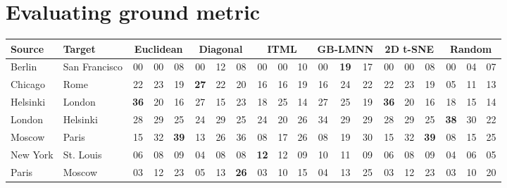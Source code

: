 \documentclass[svgnames,a4paper,final,notitlepage,10pt]{article}
\newcommand{\cbest}[1]{\textbf{#1}}
\newcommand{\notbest}[1]{\textcolor{light-gray}{#1}}
\begin{document}
\section*{Evaluating ground metric}
\begin{table}[ht]
	\footnotesize
    \centering
\setlength{\tabcolsep}{3pt}
\begin{tabular}{llccc|ccc|ccc|ccc|ccc|ccc}
\toprule
Source & Target & \multicolumn{3}{c}{Euclidean} & \multicolumn{3}{c}{Diagonal} & \multicolumn{3}{c}{ITML} & \multicolumn{3}{c}{GB-LMNN} &
\multicolumn{3}{c}{2D t-SNE} & \multicolumn{3}{c}{Random} \\
\midrule
Berlin & San Francisco & \notbest{00} & \notbest{00} & 08 & \notbest{00} & 12 & \notbest{08} & \notbest{00} & \notbest{00} & 10 & \notbest{00} & \cbest{19} & \notbest{17} & \notbest{00} & \notbest{00} & 08 & \notbest{00} & \notbest{04} & 07 \\
Chicago & Rome & \notbest{22} & 23 & \notbest{19} & \cbest{27} & \notbest{22} & \notbest{20} & \notbest{16} & \notbest{16} & 19 & \notbest{16} & 24 & \notbest{22} & \notbest{22} & 23 & \notbest{19} & \notbest{05} & \notbest{11} & 13 \\
Helsinki & London & \cbest{36} & \notbest{20} & \notbest{16} & 27 & \notbest{15} & \notbest{23} & \notbest{18} & 25 & \notbest{14} & 27 & \notbest{25} & \notbest{19} & \cbest{36} & \notbest{20} & \notbest{16} & 18 & \notbest{15} & \notbest{14} \\
London & Helsinki & \notbest{28} & 29 & \notbest{25} & \notbest{24} & 29 & \notbest{25} & \notbest{24} & \notbest{20} & 26 & 34 & \notbest{29} & \notbest{29} & \notbest{28} & 29 & \notbest{25} & \cbest{38} & \notbest{30} & \notbest{22} \\
Moscow & Paris & \notbest{15} & \notbest{32} & \cbest{39} & \notbest{13} & \notbest{26} & 36 & \notbest{08} & \notbest{17} & 26 & \notbest{08} & \notbest{19} & 30 & \notbest{15} & \notbest{32} & \cbest{39} & \notbest{08} & \notbest{15} & 25 \\
New York & St. Louis & \notbest{06} & \notbest{08} & 09 & \notbest{04} & 08 & \notbest{08} & \cbest{12} & \notbest{12} & \notbest{09} & \notbest{10} & 11 & \notbest{09} & \notbest{06} & \notbest{08} & 09 & \notbest{04} & 06 & \notbest{05} \\
Paris & Moscow & \notbest{03} & \notbest{12} & 23 & \notbest{05} & \notbest{13} & \cbest{26} & \notbest{03} & \notbest{10} & 15 & \notbest{04} & \notbest{13} & 25 & \notbest{03} & \notbest{12} & 23 & \notbest{03} & \notbest{10} & 20 \\

\end{tabular}
\end{table}
\end{document}
